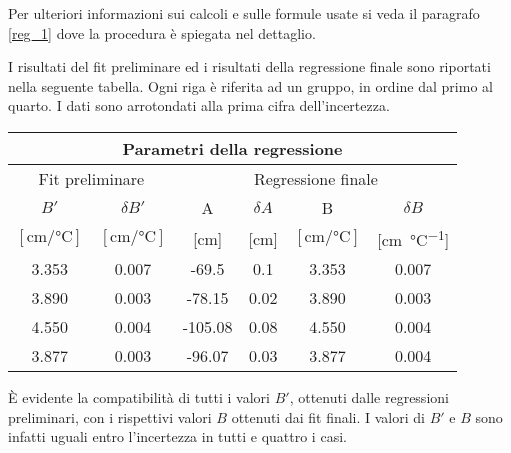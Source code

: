 Per ulteriori informazioni sui calcoli e sulle formule usate si veda il paragrafo \ref{reg_1} dove la procedura è spiegata
nel dettaglio.

I risultati del fit preliminare ed i risultati della regressione finale sono riportati nella seguente tabella.
Ogni riga è riferita ad un gruppo, in ordine dal primo al quarto. I dati sono arrotondati alla prima cifra dell'incertezza.

\begin{center}
    \begin{tabular}{c c | c c c c}
        \multicolumn{6}{c}{\textbf{Parametri della regressione}} \\
        \toprule
        \multicolumn{2}{c|}{Fit preliminare} & \multicolumn{4}{c}{Regressione finale} \\
        \midrule
        $B'$ & $\delta B'$ & A & $\delta A$ & B & $\delta B$ \\
        $[\si{\centi\meter\per\celsius}]$ & $[\si{\centi\meter\per\celsius}]$ &
        [cm] & [cm] & $[\si{\centi\meter\per\celsius}]$ & [\si{\centi\metre\per\celsius}] \\
        \midrule
        3.353 & 0.007 & -69.5  & 0.1 & 3.353 & 0.007 \\
        3.890 & 0.003 & -78.15  & 0.02 & 3.890 & 0.003 \\
        4.550 & 0.004 & -105.08 & 0.08 & 4.550 & 0.004 \\
        3.877 & 0.003 & -96.07  & 0.03 & 3.877 & 0.004 \\
        \bottomrule
    \end{tabular}
\end{center}

È evidente la compatibilità di tutti i valori $B'$, ottenuti dalle regressioni preliminari, con i rispettivi valori $B$ ottenuti dai
fit finali. I valori di $B'$ e $B$ sono infatti uguali entro l'incertezza in tutti e quattro i casi.
